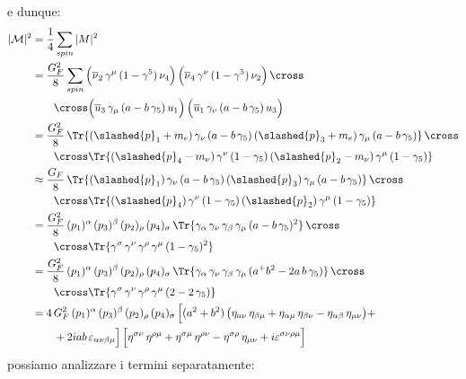 \noindent e dunque:
\begin{align}
    |\mathcal{M}|^2 &= \frac{1}{4}\sum_{spin}|M|^2 \\
    &= \frac{G_F^2}{8}\sum_{spin} \Big( \overline{\nu}_2\, \gamma^\mu\, (1-\gamma^5)\, \nu_4 \Big)\, \Big( \overline{\nu}_4\, \gamma^\nu\, (1-\gamma^5)\, \nu_2 \Big)\, \cross \notag \\
    &\qquad \cross \Big( \overline{u}_3\, \gamma_\mu\, (a-b\, \gamma_5)\, u_1 \Big)\, \Big( \overline{u}_1\, \gamma_\nu\, (a-b\, \gamma_5)\, u_3 \Big) \\
    &= \frac{G_F^2}{8}\, \Tr{(\slashed{p}_1 + m_e)\, \gamma_\nu\, (a - b\, \gamma_5)\, (\slashed{p}_3 + m_e)\, \gamma_\mu\, (a - b\, \gamma_5)}\, \cross \notag \\
    &\qquad \cross \Tr{(\slashed{p}_4 - m_\nu)\, \gamma^\nu\, (1 -  \gamma_5)\, (\slashed{p}_2 - m_\nu)\, \gamma^\mu\, (1 - \gamma_5)} \\
    &\approx \frac{G_F}{8}\, \Tr{(\slashed{p}_1)\, \gamma_\nu\, (a - b\, \gamma_5)\, (\slashed{p}_3)\, \gamma_\mu\, (a - b\, \gamma_5)}\, \cross \notag \\
    &\qquad \cross \Tr{(\slashed{p}_4)\, \gamma^\nu\, (1 -  \gamma_5)\, (\slashed{p}_2)\, \gamma^\mu\, (1 - \gamma_5)} \\
    &= \frac{G_F^2}{8}\, (p_1)^\alpha\, (p_3)^\beta\, (p_2)_\rho\, (p_4)_\sigma\, \Tr{\gamma_\alpha\, \gamma_\nu\, \gamma_\beta\, \gamma_\mu\, (a - b\, \gamma_5)^2}\, \cross \notag \\
    &\qquad \cross \Tr{\gamma^\sigma\, \gamma^\nu\, \gamma^\rho\, \gamma^\mu\, (1 - \gamma_5)^2} \\
    &= \frac{G_F^2}{8}\, (p_1)^\alpha\, (p_3)^\beta\, (p_2)_\rho\, (p_4)_\sigma\, \Tr{\gamma_\alpha\, \gamma_\nu\, \gamma_\beta\, \gamma_\mu\, (a^ + b^2 - 2a\, b\, \gamma_5)}\, \cross \notag \\
    &\qquad \cross \Tr{\gamma^\sigma\, \gamma^\nu\, \gamma^\rho\, \gamma^\mu\, (2 - 2\, \gamma_5)} \\
    &= 4\, G_F^2\, (p_1)^\alpha\, (p_3)^\beta\, (p_2)_\rho\, (p_4)_\sigma\, \Big[ (a^2 + b^2)\, \big( \eta_{a\nu}\, \eta_{\beta\mu} + \eta_{\alpha\mu}\, \eta_{\beta\nu} - \eta_{\alpha\beta}\, \eta_{\mu\nu} \big) + \notag \\
    &\qquad + 2iab\, \varepsilon_{\alpha\nu\beta\mu} \Big]\, \Big[ \eta^{\sigma\nu}\, \eta^{\rho\mu} + \eta^{\sigma\mu}\, \eta^{\rho\nu} - \eta^{\sigma\rho}\, \eta_{\mu\nu} + i\varepsilon^{\sigma\nu\rho\mu} \Big]
\end{align}
possiamo analizzare i termini separatamente:
